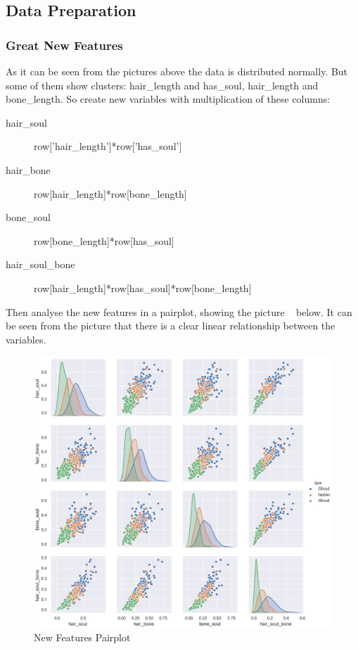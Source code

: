 \subsection{Data Preparation}

\subsubsection{Great New Features}


As it can be seen from 
the pictures above 
the data is distributed normally. 
But some of them show clusters: 
hair_length and has_soul, 
hair_length and bone_length. 
So create new variables 
with multiplication of these columns: 

\begin{description}
	\item[hair_soul] row[’hair_length’]*row[’has_soul’] 
	\item[hair_bone]  row[hair_length]*row[bone_length] 
	\item[bone_soul]  row[bone_length]*row[has_soul] 
	\item[hair_soul_bone]  row[hair_length]*row[has_soul]*row[bone_length] 
\end{description}


Then analyse the new features in a pairplot, 
showing the picture ~
below. 
It can be seen from the picture that 
there is a clear linear relationship 
between the variables. 


\begin{figure}[htbp]
	\centering
	\includegraphics[scale=0.3]{figures/hist_1.eps}
	\caption{New Features Pairplot}\label{fig:new_pairplot}
\end{figure}


